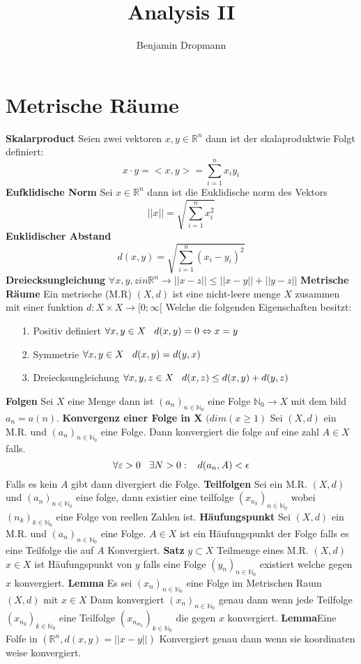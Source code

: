 \documentclass{article}
\author{Benjamin Dropmann}
\title{Analysis II}
\newcommand{\mspc}{\hspace{0.3cm}}
\begin{document}
\maketitle

\section{Metrische Räume}
\textbf{Skalarproduct} Seien zwei vektoren $x,y\in\mathbb{R}^n$ dann ist der skalaproduktwie Folgt definiert: \[x\cdot y=<x,y>=\sum_{i=1}^nx_iy_i\]
\textbf{Eufklidische Norm} Sei $x\in \mathbb{R}^n$ dann ist die Euklidische norm des Vektors \[||x||=\sqrt{\sum_{i=1}^nx_i^2}\]
\textbf{Euklidischer Abstand  } \[d(x,y)=\sqrt{\sum^n_{i=1}(x_i-y_i)^2}\]
\textbf{Dreiecksungleichung  }$\forall x,y,zin\mathbb{R}^n\rightarrow||x-z||\le||x-y||+||y-z||$
\textbf{Metrische Räume} Ein metrische (M.R) $(X,d)$ ist eine nicht-leere menge $X$ zusammen mit einer funktion $d:X\times X\rightarrow[0;\infty[$ Welche die folgenden Eigenschaften besitzt:
\begin{itemize}
\item[1.]{Positiv definiert $\forall x,y\in X\mspc d(x,y)=0\Leftrightarrow x=y$}
\item[2.]{Symmetrie $\forall x,y \in X\mspc d(x,y)=d(y,x)$}
\item[3.]{Dreiecksungleichung $\forall x,y,z\in X\mspc d(x,z)\le d(x,y)+d(y,z)$}
\end{itemize}
\textbf{Folgen} Sei $X$ eine Menge dann ist $(a_n)_{n\in\mathbb{N}_0}$ eine Folge $\mathbb{N}_0\rightarrow X$ mit dem bild $a_n=a(n)$.\newline
\textbf{Konvergenz einer Folge in X} $(dim(x\ge1)$ Sei $(X,d)$ ein M.R. und $(a_n)_{n\in\mathbb{N}_0}$ eine Folge.  Dann konvergiert die folge auf eine zahl $A\in X$ falls.
\[\forall\varepsilon>0\mspc\exists N>0:\mspc d(a_n,A)<\epsilon\]
Falls es kein $A$ gibt dann divergiert die Folge.\newline
\textbf{Teilfolgen} Sei ein M.R. $(X,d)$ und $(a_n)_{n\in\mathbb{N}_0}$ eine folge, dann existier eine teilfolge $(x_{n_k})_{n\in\mathbb{N}_0}$ wobei $(n_k)_{k\in\mathbb{N}_0}$ eine Folge von reellen Zahlen ist.\newline
\textbf{Häufungspunkt} Sei $(X,d)$ ein M.R. und $(a_n)_{n\in\mathbb{N}_0}$ eine Folge. $A\in X$ ist ein Häufungspunkt der Folge falls es eine Teilfolge die auf $A$ Konvergiert.\newline
\textbf{Satz} $y\subset X$ Teilmenge eines M.R. $(X,d)$ $x\in X$ ist Häufungspunkt von $y$ falls eine Folge $(y_n)_{n\in\mathbb{N}_0}$ existiert welche gegen $x$ konvergiert.
\newline\textbf{Lemma} Es sei $(x_n)_{n\in\mathbb{N}_0}$ eine Folge im Metrischen Raum $(X,d)$ mit $x\in X$ Dann konvergiert $(x_n)_{n\in\mathbb{N}_0}$ genau dann wenn jede Teilfolge $(x_{n_k})_{k\in\mathbb{N}_0}$ eine Teilfolge $(x_{n_{m_k}})_{k\in\mathbb{N}_0}$ die gegen $x$ konvergiert.
\newline\textbf{Lemma}Eine Folfe in $(\mathbb{R}^n, d(x,y)=||x-y||)$ Konvergiert genau dann wenn sie koordinaten weise konvergiert.
\end{document}
